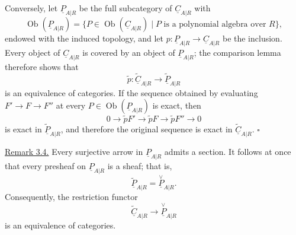 Conversely, let $\underline P_{A|R}$ be the full subcategory of
$\underline C_{A|R}$ with
\[
 \operatorname{Ob}(\underline P_{A|R})=
 \{P\in\operatorname{Ob}(\underline C_{A|R})\mid
   P\text{ is a polynomial algebra over }R\},
\]
endowed with the induced topology, and let
$p:\underline P_{A|R}\longrightarrow\underline C_{A|R}$ be the
inclusion. Every object of $\underline C_{A|R}$ is covered by an
object of $\underline P_{A|R}$; the comparison lemma therefore
shows that
\[
 \widetilde p:\widetilde{\underline C}_{A|R}
 \longrightarrow\widetilde{\underline P}_{A|R}
\]
is an equivalence of categories. If the sequence obtained by
evaluating $F'\longrightarrow F\longrightarrow F''$ at every
$P\in\operatorname{Ob}(\underline P_{A|R})$ is exact, then
\[
 0\longrightarrow\widetilde pF'\longrightarrow\widetilde pF
 \longrightarrow\widetilde pF''\longrightarrow0
\]
is exact in $\widetilde{\underline P}_{A|R}$, and therefore the
original sequence is exact in
$\widetilde{\underline C}_{A|R}$. \hfill$\square$


\underline{Remark 3.4.} Every surjective arrow in
$\underline P_{A|R}$ admits a section. It follows at once that every
presheaf on $\underline P_{A|R}$ is a sheaf; that is,
\[
 \widetilde{\underline P}_{A|R}=
 \overset{\vee}{\underline P}_{A|R}.
\]
Consequently, the restriction functor
\[
 \widetilde{\underline C}_{A|R}
 \longrightarrow\overset{\vee}{\underline P}_{A|R}
\]
is an equivalence of categories.
